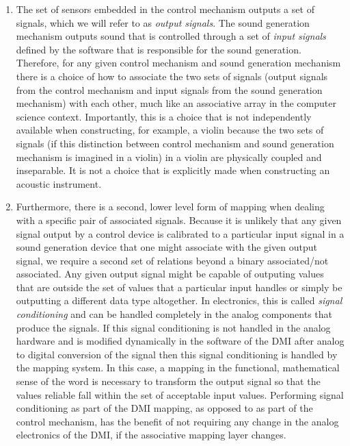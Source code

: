 \begin{enumerate}
\item The set of sensors embedded in the control mechanism outputs a set of signals, which we will refer to as \emph{output signals}. The sound generation mechanism outputs sound that is controlled through a set of \emph{input signals} defined by the software that is responsible for the sound generation. Therefore, for any given control mechanism and sound generation mechanism there is a choice of how to associate the two sets of signals (output signals from the control mechanism and input signals from the sound generation mechanism) with each other, much like an associative array in the computer science context. Importantly, this is a choice that is not independently available when constructing, for example, a violin because the two sets of signals (if this distinction between control mechanism and sound generation mechanism is imagined in a violin) in a violin are physically coupled and inseparable. It is not a choice that is explicitly made when constructing an acoustic instrument.

\item Furthermore, there is a second, lower level form of mapping when dealing with a specific pair of associated signals. Because it is unlikely that any given signal output by a control device is calibrated to a particular input signal in a sound generation device that one might associate with the given output signal, we require a second set of relations beyond a binary associated/not associated. Any given output signal might be capable of outputing values that are outside the set of values that a particular input handles or simply be outputting a different data type altogether. In electronics, this is called \emph{signal conditioning} and can be handled completely in the analog components that produce the signals. If this signal conditioning is not handled in the analog hardware and is modified dynamically in the software of the DMI after analog to digital conversion of the signal then this signal conditioning is handled by the mapping system. In this case, a mapping in the functional, mathematical sense of the word is necessary to transform the output signal so that the values reliable fall within the set of acceptable input values. Performing signal conditioning as part of the DMI mapping, as opposed to as part of the control mechanism, has the benefit of not requiring any change in the analog electronics of the DMI, if the associative mapping layer changes.
\end{enumerate}

